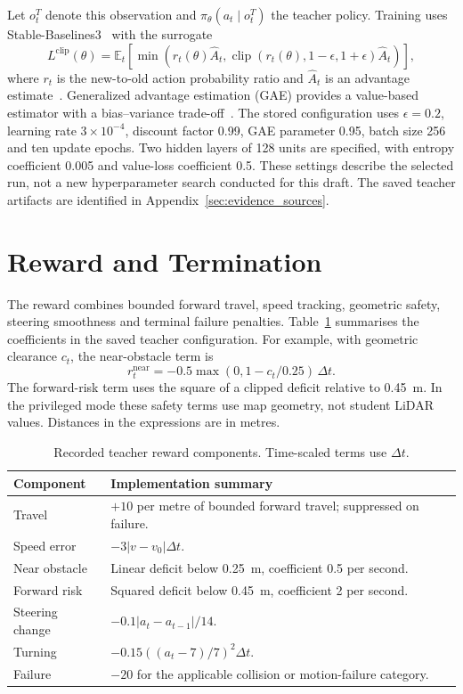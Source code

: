 Let $o_t^T$ denote this observation and $\pi_\theta(a_t\mid o_t^T)$ the teacher
policy. Training uses Stable-Baselines3~\cite{raffin2021sb3} with the surrogate
\begin{equation}
 L^{\mathrm{clip}}(\theta)=\mathbb{E}_t\!\left[
 \min\!\left(r_t(\theta)\hat A_t,
 \operatorname{clip}(r_t(\theta),1-\epsilon,1+\epsilon)\hat A_t\right)\right],
\end{equation}
where $r_t$ is the new-to-old action probability ratio and $\hat A_t$ is an
advantage estimate~\cite{schulman2017ppo}. Generalized advantage estimation
(GAE) provides a value-based estimator with a bias--variance trade-off~\cite{schulman2015gae}.
The stored configuration uses
$\epsilon=0.2$, learning rate $3\times10^{-4}$, discount factor 0.99,
GAE parameter 0.95, batch size 256 and ten update epochs. Two hidden layers
of 128 units are specified, with entropy coefficient 0.005 and value-loss
coefficient 0.5. These settings describe the selected run, not a new
hyperparameter search conducted for this draft. The saved teacher artifacts
are identified in Appendix~\ref{sec:evidence_sources}.

\section{Reward and Termination}
The reward combines bounded forward travel, speed tracking, geometric safety,
steering smoothness and terminal failure penalties. Table~\ref{tab:reward}
summarises the coefficients in the saved teacher configuration. For example,
with geometric clearance $c_t$, the near-obstacle term is
\begin{equation}
 r_t^{\mathrm{near}}=-0.5\max(0,1-c_t/0.25)\,\Delta t.
\end{equation}
The forward-risk term uses the square of a clipped deficit relative to
0.45~m. In the privileged mode these safety terms use map geometry, not
student LiDAR values. Distances in the expressions are in metres.

\begin{table}[htbp]
\centering\small
\caption[Teacher reward components]{Recorded teacher reward components. Time-scaled terms use $\Delta t$.}
\label{tab:reward}
\begin{tabularx}{\textwidth}{p{3.2cm}X}
\toprule Component & Implementation summary \\\midrule
Travel & $+10$ per metre of bounded forward travel; suppressed on failure. \\
Speed error & $-3|v-v_0|\Delta t$. \\
Near obstacle & Linear deficit below 0.25~m, coefficient 0.5 per second. \\
Forward risk & Squared deficit below 0.45~m, coefficient 2 per second. \\
Steering change & $-0.1|a_t-a_{t-1}|/14$. \\
Turning & $-0.15((a_t-7)/7)^2\Delta t$. \\
Failure & $-20$ for the applicable collision or motion-failure category. \\
\bottomrule
\end{tabularx}
\end{table}


